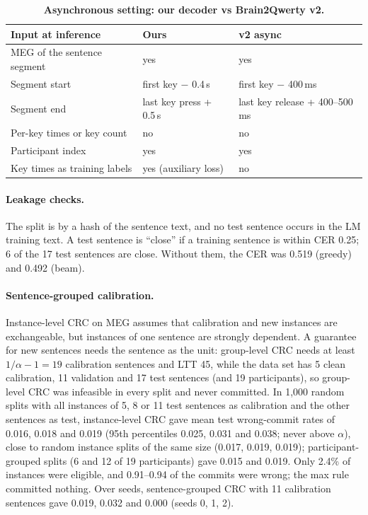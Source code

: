 \begin{table}[H]
  \centering
  \caption{\textbf{Asynchronous setting: our decoder vs Brain2Qwerty v2.}}
  \label{tab:async}
  \small
  \begin{tabular}{@{}lll@{}}
    \toprule
    \textbf{Input at inference} & \textbf{Ours} & \textbf{v2 async \citep{zhang2026brain2qwertyv2}} \\
    \midrule
    MEG of the sentence segment & yes & yes \\
    Segment start & first key $-$ 0.4\,s & first key $-$ 400\,ms \\
    Segment end & last key press + 0.5\,s & last key release + 400--500\,ms \\
    Per-key times or key count & no & no \\
    Participant index & yes & yes \\
    Key times as training labels & yes (auxiliary loss) & no \\
    \bottomrule
  \end{tabular}
\end{table}

\paragraph{Leakage checks.} The split is by a hash of the sentence text, and no test sentence occurs in the LM training text. A test sentence is ``close'' if a training sentence is within CER 0.25; 6 of the 17 test sentences are close. Without them, the CER was 0.519 (greedy) and 0.492 (beam).

\paragraph{Sentence-grouped calibration.} Instance-level CRC on MEG assumes that calibration and new instances are exchangeable, but instances of one sentence are strongly dependent. A guarantee for new sentences needs the sentence as the unit: group-level CRC needs at least $1/\alpha - 1 = 19$ calibration sentences and LTT 45, while the data set has 5 clean calibration, 11 validation and 17 test sentences (and 19 participants), so group-level CRC was infeasible in every split and never committed. In 1,000 random splits with all instances of 5, 8 or 11 test sentences as calibration and the other sentences as test, instance-level CRC gave mean test wrong-commit rates of 0.016, 0.018 and 0.019 (95th percentiles 0.025, 0.031 and 0.038; never above $\alpha$), close to random instance splits of the same size (0.017, 0.019, 0.019); participant-grouped splits (6 and 12 of 19 participants) gave 0.015 and 0.019. Only 2.4\% of instances were eligible, and 0.91--0.94 of the commits were wrong; the max rule committed nothing. Over seeds, sentence-grouped CRC with 11 calibration sentences gave 0.019, 0.032 and 0.000 (seeds 0, 1, 2).

